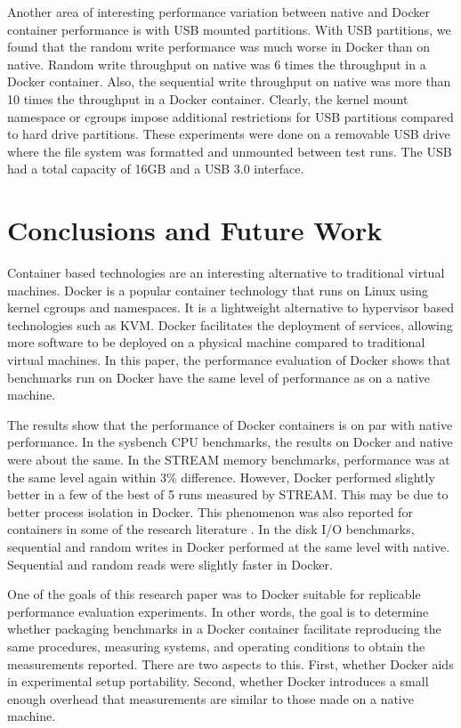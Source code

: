 \documentclass[11pt]{article}
\begin{document}
Another area of interesting performance variation between native and Docker container performance is with USB mounted partitions. With USB partitions, we found that the random write performance was much worse in Docker than on native. Random write throughput on native was 6 times the throughput in a Docker container. Also, the sequential write throughput on native was more than 10 times the throughput in a Docker container. Clearly, the kernel mount namespace or cgroups impose additional restrictions for USB partitions compared to hard drive partitions. These experiments were done on a removable USB drive where the file system was formatted and unmounted between test runs. The USB had a total capacity of 16GB and a USB 3.0 interface. 

\section{Conclusions and Future Work}

Container based technologies are an interesting alternative to traditional virtual machines. Docker is a popular container technology that runs on Linux using kernel cgroups and namespaces. It is a lightweight alternative to hypervisor based technologies such as KVM. Docker facilitates the deployment of services, allowing more software to be deployed on a physical machine compared to traditional virtual machines. In this paper, the performance evaluation of Docker shows that benchmarks run on Docker have the same level of performance as on a native machine. 

The results show that the performance of Docker containers is on par with native performance. In the sysbench CPU benchmarks, the results on Docker and native were about the same. In the STREAM memory benchmarks, performance was at the same level again within 3\% difference. However, Docker performed slightly better in a few of the best of 5 runs measured by STREAM. This may be due to better process isolation in Docker. This phenomenon was also reported for containers in some of the research literature \cite{estrada}. In the disk I/O benchmarks, sequential and random writes in Docker performed at the same level with native. Sequential and random reads were slightly faster in Docker. 

One of the goals of this research paper was to Docker suitable for replicable performance evaluation experiments. In other words, the goal is to determine whether packaging benchmarks in a Docker container facilitate reproducing the same procedures, measuring systems, and operating conditions to obtain the measurements reported. There are two aspects to this. First, whether Docker aids in experimental setup portability. Second, whether Docker introduces a small enough overhead that measurements are similar to those made on a native machine. 
\end{document}
